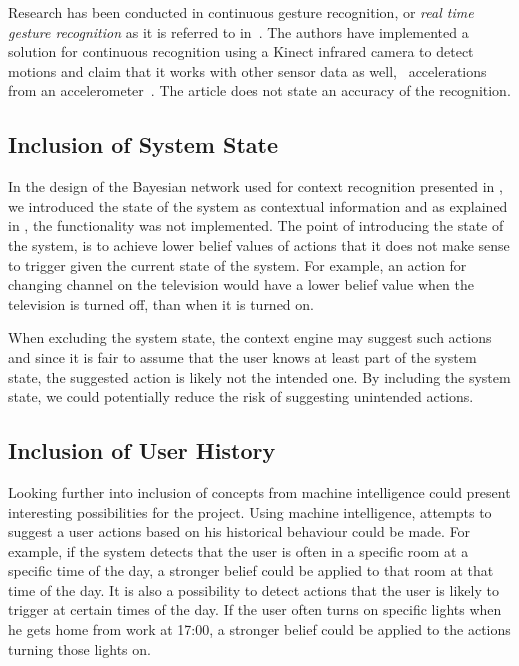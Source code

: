 Research has been conducted in continuous gesture recognition, or \emph{real time gesture recognition} as it is referred to in~\cite{gillian2014gesture}. The authors have implemented a solution for continuous recognition using a Kinect infrared camera to detect motions and claim that it works with other sensor data as well, \eg~accelerations from an accelerometer~\cite{gillian2014gesture}. The article does not state an accuracy of the recognition.

\subsection{Inclusion of System State}

In the design of the Bayesian network used for context recognition presented in , we introduced the state of the system as contextual information and as explained in , the functionality was not implemented. The point of introducing the state of the system, is to achieve lower belief values of actions that it does not make sense to trigger given the current state of the system. For example, an action for changing channel on the television would have a lower belief value when the television is turned off, than when it is turned on. 

When excluding the system state, the context engine may suggest such actions and since it is fair to assume that the user knows at least part of the system state, the suggested action is likely not the intended one. By including the system state, we could potentially reduce the risk of suggesting unintended actions.

\subsection{Inclusion of User History}

Looking further into inclusion of concepts from machine intelligence could present interesting possibilities for the project. Using machine intelligence, attempts to suggest a user actions based on his historical behaviour could be made. For example, if the system detects that the user is often in a specific room at a specific time of the day, a stronger belief could be applied to that room at that time of the day. It is also a possibility to detect actions that the user is likely to trigger at certain times of the day. If the user often turns on specific lights when he gets home from work at 17:00, a stronger belief could be applied to the actions turning those lights on.

